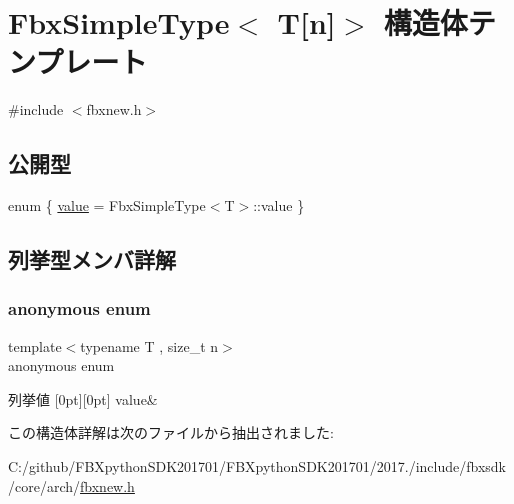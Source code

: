 \hypertarget{struct_fbx_simple_type_3_01_t[n]_4}{}\section{Fbx\+Simple\+Type$<$ T\mbox{[}n\mbox{]}$>$ 構造体テンプレート}
\label{struct_fbx_simple_type_3_01_t[n]_4}


{\ttfamily \#include $<$fbxnew.\+h$>$}

\subsection*{公開型}
\begin{DoxyCompactItemize}
\item 
enum \{ \hyperlink{struct_fbx_simple_type_3_01_t[n]_4_a57a3418a309c16047895533b4c30bf13ae090ea116d72509fb797fa0bdb5f3edb}{value} = Fbx\+Simple\+Type$<$T$>$\+:\+:value
 \}
\end{DoxyCompactItemize}


\subsection{列挙型メンバ詳解}
\mbox{\label{struct_fbx_simple_type_3_01_t[n]_4_a57a3418a309c16047895533b4c30bf13}} 
\subsubsection{\texorpdfstring{anonymous enum}{anonymous enum}}
{\footnotesize\ttfamily template$<$typename T , size\+\_\+t n$>$ \\
anonymous enum}

\begin{DoxyEnumFields}{列挙値}
[0pt][0pt]{}\mbox{\label{struct_fbx_simple_type_3_01_t[n]_4_a57a3418a309c16047895533b4c30bf13ae090ea116d72509fb797fa0bdb5f3edb}} 
value&\\
\hline

\end{DoxyEnumFields}


この構造体詳解は次のファイルから抽出されました\+:\begin{DoxyCompactItemize}
\item 
C\+:/github/\+F\+B\+Xpython\+S\+D\+K201701/\+F\+B\+Xpython\+S\+D\+K201701/2017./include/fbxsdk/core/arch/\hyperlink{fbxnew_8h}{fbxnew.\+h}\end{DoxyCompactItemize}
